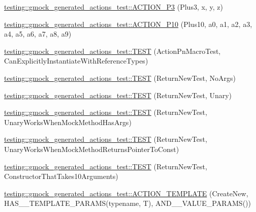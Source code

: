 \begin{DoxyCompactItemize}
\item 
\hyperlink{namespacetesting_1_1gmock__generated__actions__test_afc911947c840aa9857eb2d06e4d80787}{testing\+::gmock\+\_\+generated\+\_\+actions\+\_\+test\+::\+A\+C\+T\+I\+O\+N\+\_\+\+P3} (Plus3, x, y, z)
\item 
\hyperlink{namespacetesting_1_1gmock__generated__actions__test_a4e48e01a7bfc369d279cc0c99a7d3c60}{testing\+::gmock\+\_\+generated\+\_\+actions\+\_\+test\+::\+A\+C\+T\+I\+O\+N\+\_\+\+P10} (Plus10, a0, a1, a2, a3, a4, a5, a6, a7, a8, a9)
\item 
\hyperlink{namespacetesting_1_1gmock__generated__actions__test_a20664d32f08c53d6f9fa5e020a85fab3}{testing\+::gmock\+\_\+generated\+\_\+actions\+\_\+test\+::\+T\+E\+ST} (Action\+Pn\+Macro\+Test, Can\+Explicitly\+Instantiate\+With\+Reference\+Types)
\item 
\hyperlink{namespacetesting_1_1gmock__generated__actions__test_a058a3d17071ddb888319ab71b491af94}{testing\+::gmock\+\_\+generated\+\_\+actions\+\_\+test\+::\+T\+E\+ST} (Return\+New\+Test, No\+Args)
\item 
\hyperlink{namespacetesting_1_1gmock__generated__actions__test_a64f3f8327d51c139b441846e809ae4bc}{testing\+::gmock\+\_\+generated\+\_\+actions\+\_\+test\+::\+T\+E\+ST} (Return\+New\+Test, Unary)
\item 
\hyperlink{namespacetesting_1_1gmock__generated__actions__test_ad8f696b14b0f2dba4986c53f615aef15}{testing\+::gmock\+\_\+generated\+\_\+actions\+\_\+test\+::\+T\+E\+ST} (Return\+New\+Test, Unary\+Works\+When\+Mock\+Method\+Has\+Args)
\item 
\hyperlink{namespacetesting_1_1gmock__generated__actions__test_ad9f45ddc4a5616b919116c766ad37a30}{testing\+::gmock\+\_\+generated\+\_\+actions\+\_\+test\+::\+T\+E\+ST} (Return\+New\+Test, Unary\+Works\+When\+Mock\+Method\+Returns\+Pointer\+To\+Const)
\item 
\hyperlink{namespacetesting_1_1gmock__generated__actions__test_a1ed6392f4aeb68b9429ff7dd98ce5a86}{testing\+::gmock\+\_\+generated\+\_\+actions\+\_\+test\+::\+T\+E\+ST} (Return\+New\+Test, Constructor\+That\+Takes10\+Arguments)
\item 
\hyperlink{namespacetesting_1_1gmock__generated__actions__test_a1debc0726715951fcd7f5443e436dc46}{testing\+::gmock\+\_\+generated\+\_\+actions\+\_\+test\+::\+A\+C\+T\+I\+O\+N\+\_\+\+T\+E\+M\+P\+L\+A\+TE} (Create\+New, H\+A\+S\+\_\+\_\+\+T\+E\+M\+P\+L\+A\+T\+E\+\_\+\+P\+A\+R\+A\+MS(typename, T), A\+N\+D\+\_\+\_\+\+V\+A\+L\+U\+E\+\_\+\+P\+A\+R\+A\+MS())
\item 

\end{DoxyCompactItemize}
